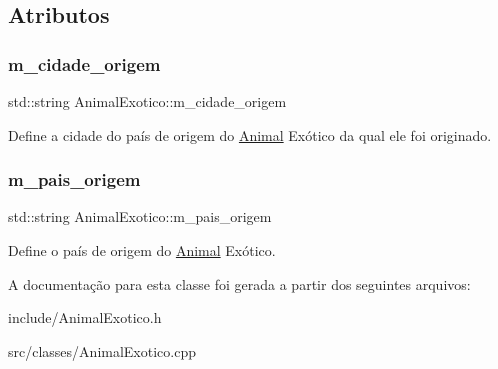 \subsection{Atributos}
\mbox{\label{classAnimalExotico_a99e6ec9acb3106efc101a828f645c1dc}} 
\subsubsection{\texorpdfstring{m\+\_\+cidade\+\_\+origem}{m\_cidade\_origem}}
{\footnotesize\ttfamily std\+::string Animal\+Exotico\+::m\+\_\+cidade\+\_\+origem\hspace{0.3cm}{\ttfamily [protected]}}

Define a cidade do país de origem do \hyperlink{classAnimal}{Animal} Exótico da qual ele foi originado. \mbox{\label{classAnimalExotico_a5a00f07c9cd9f11baadef0282eaad031}} 
\subsubsection{\texorpdfstring{m\+\_\+pais\+\_\+origem}{m\_pais\_origem}}
{\footnotesize\ttfamily std\+::string Animal\+Exotico\+::m\+\_\+pais\+\_\+origem\hspace{0.3cm}{\ttfamily [protected]}}

Define o país de origem do \hyperlink{classAnimal}{Animal} Exótico. 

A documentação para esta classe foi gerada a partir dos seguintes arquivos\+:\begin{DoxyCompactItemize}
\item 
include/Animal\+Exotico.\+h\item 
src/classes/Animal\+Exotico.\+cpp\end{DoxyCompactItemize}
